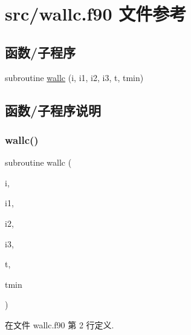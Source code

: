 \hypertarget{wallc_8f90}{}\section{src/wallc.f90 文件参考}
\label{wallc_8f90}
\subsection*{函数/子程序}
\begin{DoxyCompactItemize}
\item 
subroutine \mbox{\hyperlink{wallc_8f90_ade0bbe7488fb80deb14ff1f8c2d8d8dc}{wallc}} (i, i1, i2, i3, t, tmin)
\end{DoxyCompactItemize}


\subsection{函数/子程序说明}
\mbox{\label{wallc_8f90_ade0bbe7488fb80deb14ff1f8c2d8d8dc}} 
\subsubsection{\texorpdfstring{wallc()}{wallc()}}
{\footnotesize\ttfamily subroutine wallc (\begin{DoxyParamCaption}\item[{}]{i,  }\item[{}]{i1,  }\item[{}]{i2,  }\item[{}]{i3,  }\item[{}]{t,  }\item[{}]{tmin }\end{DoxyParamCaption})}



在文件 wallc.\+f90 第 2 行定义.

